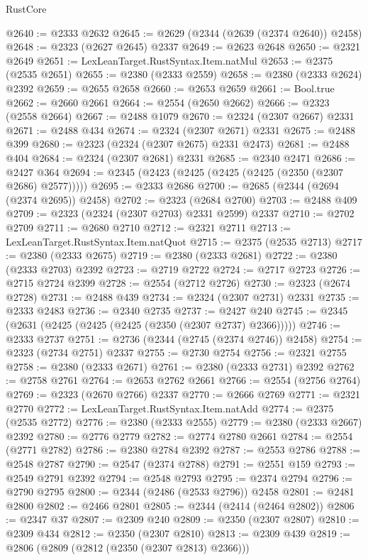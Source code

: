 \begin{lexlean}{RustCore}
\begin{coremodule}
@2640 := @2333 @2632
@2645 := @2629 (@2344 (@2639 (@2374 @2640)) @2458)
@2648 := @2323 (@2627 @2645) @2337
@2649 := @2623 @2648
@2650 := @2321 @2649
@2651 := LexLeanTarget.RustSyntax.Item.natMul
@2653 := @2375 (@2535 @2651)
@2655 := @2380 (@2333 @2559)
@2658 := @2380 (@2333 @2624) @2392
@2659 := @2655 @2658
@2660 := @2653 @2659
@2661 := Bool.true
@2662 := @2660 @2661
@2664 := @2554 (@2650 @2662)
@2666 := @2323 (@2558 @2664)
@2667 := @2488 @1079
@2670 := @2324 (@2307 @2667) @2331
@2671 := @2488 @434
@2674 := @2324 (@2307 @2671) @2331
@2675 := @2488 @399
@2680 := @2323 (@2324 (@2307 @2675) @2331 @2473)
@2681 := @2488 @404
@2684 := @2324 (@2307 @2681) @2331
@2685 := @2340 @2471
@2686 := @2427 @364
@2694 := @2345 (@2423 (@2425 (@2425 (@2425 (@2350 (@2307 @2686) @2577)))))
@2695 := @2333 @2686
@2700 := @2685 (@2344 (@2694 (@2374 @2695)) @2458)
@2702 := @2323 (@2684 @2700)
@2703 := @2488 @409
@2709 := @2323 (@2324 (@2307 @2703) @2331 @2599) @2337
@2710 := @2702 @2709
@2711 := @2680 @2710
@2712 := @2321 @2711
@2713 := LexLeanTarget.RustSyntax.Item.natQuot
@2715 := @2375 (@2535 @2713)
@2717 := @2380 (@2333 @2675)
@2719 := @2380 (@2333 @2681)
@2722 := @2380 (@2333 @2703) @2392
@2723 := @2719 @2722
@2724 := @2717 @2723
@2726 := @2715 @2724 @2399
@2728 := @2554 (@2712 @2726)
@2730 := @2323 (@2674 @2728)
@2731 := @2488 @439
@2734 := @2324 (@2307 @2731) @2331
@2735 := @2333 @2483
@2736 := @2340 @2735
@2737 := @2427 @240
@2745 := @2345 (@2631 (@2425 (@2425 (@2425 (@2350 (@2307 @2737) @2366)))))
@2746 := @2333 @2737
@2751 := @2736 (@2344 (@2745 (@2374 @2746)) @2458)
@2754 := @2323 (@2734 @2751) @2337
@2755 := @2730 @2754
@2756 := @2321 @2755
@2758 := @2380 (@2333 @2671)
@2761 := @2380 (@2333 @2731) @2392
@2762 := @2758 @2761
@2764 := @2653 @2762 @2661
@2766 := @2554 (@2756 @2764)
@2769 := @2323 (@2670 @2766) @2337
@2770 := @2666 @2769
@2771 := @2321 @2770
@2772 := LexLeanTarget.RustSyntax.Item.natAdd
@2774 := @2375 (@2535 @2772)
@2776 := @2380 (@2333 @2555)
@2779 := @2380 (@2333 @2667) @2392
@2780 := @2776 @2779
@2782 := @2774 @2780 @2661
@2784 := @2554 (@2771 @2782)
@2786 := @2380 @2784 @2392
@2787 := @2553 @2786
@2788 := @2548 @2787
@2790 := @2547 (@2374 @2788)
@2791 := @2551 @159
@2793 := @2549 @2791 @2392
@2794 := @2548 @2793
@2795 := @2374 @2794
@2796 := @2790 @2795
@2800 := @2344 (@2486 (@2533 @2796)) @2458
@2801 := @2481 @2800
@2802 := @2466 @2801
@2805 := @2344 (@2414 (@2464 @2802))
@2806 := @2347 @37
@2807 := @2309 @240
@2809 := @2350 (@2307 @2807)
@2810 := @2309 @434
@2812 := @2350 (@2307 @2810)
@2813 := @2309 @439
@2819 := @2806 (@2809 (@2812 (@2350 (@2307 @2813) @2366)))

\end{coremodule}
\end{lexlean}
